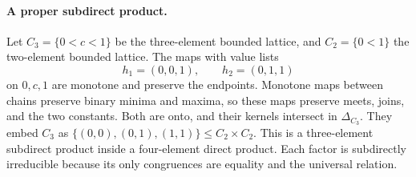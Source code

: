 \paragraph{A proper subdirect product.}
Let \(C_3=\{0<c<1\}\) be the three-element bounded lattice, and
\(C_2=\{0<1\}\) the two-element bounded lattice.
The maps with value lists
\[
 h_1=(0,0,1),\qquad h_2=(0,1,1)
\]
on \(0,c,1\) are monotone and preserve the endpoints.
Monotone maps between chains preserve binary minima and maxima,
so these maps preserve meets, joins, and the two constants.
Both are onto, and their kernels intersect in \(\Delta_{C_3}\).
They embed \(C_3\) as
\(\{(0,0),(0,1),(1,1)\}\leq C_2\times C_2\).
This is a three-element subdirect product inside a four-element
direct product.  Each factor is subdirectly irreducible because
its only congruences are equality and the universal relation.
